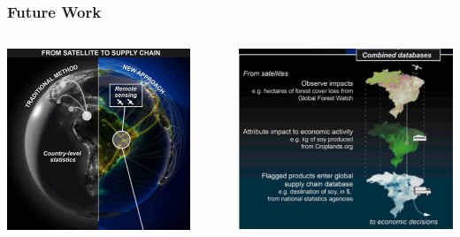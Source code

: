 \documentclass[aspectratio=169]{beamer}
\begin{document}
\begin{frame}
  \frametitle{Future Work}
\begin{columns}
\begin{column}{0.5\textwidth}
    \begin{center}
     \includegraphics[width=0.86\textwidth]{images/moran_2020_1.png}
     \end{center}
\end{column}
\begin{column}{0.5\textwidth}  %
    \begin{center}
     \includegraphics[width=1.0\textwidth]{images/moran_2020_2.png}
     \end{center}
\end{column}
\end{columns}
\end{frame}
\end{document}
